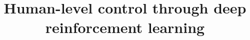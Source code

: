 \documentclass[12pt, conference, compsoc]{IEEEtran}
\begin{document}
%
\title{Human-level control through deep reinforcement learning}


\author{
\and
{}
}


%








\maketitle
\end{document}
